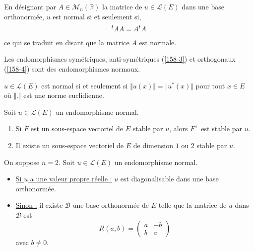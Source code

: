   \begin{remark}
    En désignant par $A \in \mathcal{M}_n(\mathbb{R})$ la matrice de $u \in \mathcal{L}(E)$ dans une base orthonormée, $u$ est normal si et seulement si,
    \[ \mathstrut ^t A A = A \mathstrut ^t A \]
    ce qui se traduit en disant que la matrice $A$ est normale.
  \end{remark}

  \begin{example}
    Les endomorphismes symétriques, anti-symétriques (\cref{158-3}) et orthogonaux (\cref{158-4}) sont des endomorphismes normaux.
  \end{example}


  \begin{proposition}
    $u \in \mathcal{L}(E)$ est normal si et seulement si $\Vert u (x) \Vert = \Vert u^* (x) \Vert$ pour tout $x \in E$ où $\Vert . \Vert$ est une norme euclidienne.
  \end{proposition}


  \begin{proposition}
    Soit $u \in \mathcal{L}(E)$ un endomorphisme normal.
    \begin{enumerate}[label=(\roman*)]
      \item Si $F$ est un sous-espace vectoriel de $E$ stable par $u$, alors $F^\perp$ est stable par $u$.
      \item Il existe un sous-espace vectoriel de $E$ de dimension $1$ ou $2$ stable par $u$.
    \end{enumerate}
  \end{proposition}

  \begin{proposition}[Réduction dans le cas $n = 2$]
    \label{158-2}
    On suppose $n = 2$. Soit $u \in \mathcal{L}(E)$ un endomorphisme normal.
    \begin{itemize}
      \item \uline{Si $u$ a une valeur propre réelle :} $u$ est diagonalisable dans une base orthonormée.
      \item \uline{Sinon :} il existe $\mathcal{B}$ une base orthonormée de $E$ telle que la matrice de $u$ dans $\mathcal{B}$ est
      \[ R(a,b) = \begin{pmatrix} a & -b \\ b & a \end{pmatrix} \]
      avec $b \neq 0$.
    \end{itemize}
  \end{proposition}

